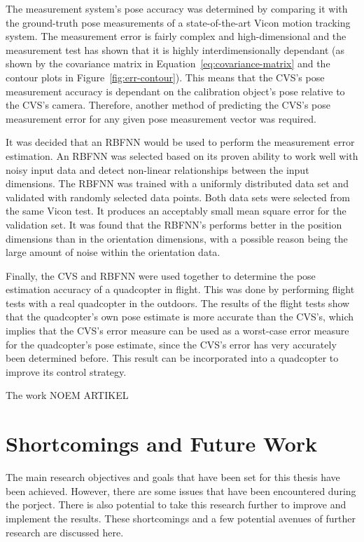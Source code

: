 The measurement system's pose accuracy was determined by comparing it with the ground-truth pose measurements of a state-of-the-art Vicon motion tracking system. The measurement error is fairly complex and high-dimensional and the measurement test has shown that it is highly interdimensionally dependant (as shown by the covariance matrix in Equation~\ref{eq:covariance-matrix} and the contour plots in Figure~\ref{fig:err-contour}). This means that the CVS's pose measurement accuracy is dependant on the calibration object's pose relative to the CVS's camera. Therefore, another method of predicting the CVS's pose measurement error for any given pose measurement vector was required.

It was decided that an RBFNN would be used to perform the measurement error estimation. An RBFNN was selected based on its proven ability to work well with noisy input data and detect non-linear relationships between the input dimensions. The RBFNN was trained with a uniformly distributed data set and validated with randomly selected data points. Both data sets were selected from the same Vicon test. It produces an acceptably small mean square error for the validation set. It was found that the RBFNN's performs better in the position dimensions than in the orientation dimensions, with a possible reason being the large amount of noise within the orientation data. 

Finally, the CVS and RBFNN were used together to determine the pose estimation accuracy of a quadcopter in flight. This was done by performing flight tests with a real quadcopter in the outdoors. The results of the flight tests show that the quadcopter's own pose estimate is more accurate than the CVS's, which implies that the CVS's error measure can be used as a worst-case error measure for the quadcopter's pose estimate, since the CVS's error has very accurately been determined before. This result can be incorporated into a quadcopter to improve its control strategy.

The work NOEM ARTIKEL

\section{Shortcomings and Future Work}

The main research objectives and goals that have been set for this thesis have been achieved. However, there are some issues that have been encountered during the porject. There is also potential to take this research further to improve and implement the results. These shortcomings and a few potential avenues of further research are discussed here. 

